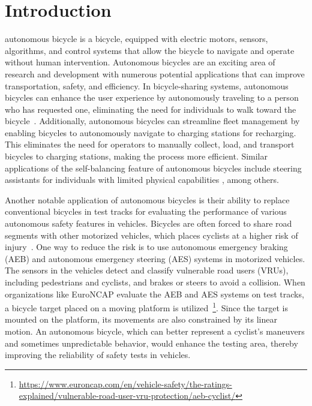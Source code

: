 \section{Introduction}
 autonomous bicycle is a bicycle, equipped with electric motors, sensors, algorithms, and control systems that allow the bicycle to navigate and operate without human intervention. Autonomous bicycles are an exciting area of research and development with numerous potential applications that can improve transportation, safety, and efficiency. In bicycle-sharing systems, autonomous bicycles can enhance the user experience by autonomously traveling to a person who has requested one, eliminating the need for individuals to walk toward the bicycle~\cite{sanchez2020autonomous}. Additionally, autonomous bicycles can streamline fleet management by enabling bicycles to autonomously navigate to charging stations for recharging. This eliminates the need for operators to manually collect, load, and transport bicycles to charging stations, making the process more efficient. Similar applications of the self-balancing feature of autonomous bicycles include steering assistants for individuals with limited physical capabilities \cite{alizadehsaravi2023bicycle}, among others.

Another notable application of autonomous bicycles is their ability to replace conventional bicycles in test tracks for evaluating the performance of various autonomous safety features in vehicles. Bicycles are often forced to share road segments with other motorized vehicles, which places cyclists at a higher risk of injury~\cite {kutela2021mining}. One way to reduce the risk is to use autonomous emergency braking (AEB) and autonomous emergency steering (AES) systems in motorized vehicles. The sensors in the vehicles detect and classify vulnerable road users (VRUs), including pedestrians and cyclists, and brakes or steers to avoid a collision. When organizations like EuroNCAP evaluate the AEB and AES systems on test tracks, a bicycle target placed on a moving platform is utilized~\footnote{\href{https://www.euroncap.com/en/vehicle-safety/the-ratings-explained/vulnerable-road-user-vru-protection/aeb-cyclist/}{https://www.euroncap.com/en/vehicle-safety/the-ratings-explained/vulnerable-road-user-vru-protection/aeb-cyclist/}}. Since the target is mounted on the platform, its movements are also constrained by its linear motion. An autonomous bicycle, which can better represent a cyclist's maneuvers and sometimes unpredictable behavior, would enhance the testing area, thereby improving the reliability of safety tests in vehicles. 


